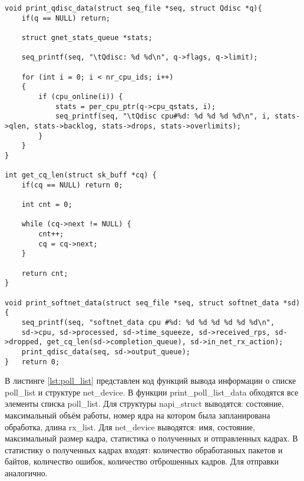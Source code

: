 \begin{center}
	\captionsetup{justification=raggedright,singlelinecheck=off}
	\begin{lstlisting}[label=lst:softnet_data_imp,caption=Функции вывода информации о структуре softnet\_data и Qdisc ,showstringspaces=false]
void print_qdisc_data(struct seq_file *seq, struct Qdisc *q){
	if(q == NULL) return;
	
	struct gnet_stats_queue *stats;
	
	seq_printf(seq, "\tQdisc: %d %d\n", q->flags, q->limit);
	
	for (int i = 0; i < nr_cpu_ids; i++)
	{
		if (cpu_online(i)) {
			stats = per_cpu_ptr(q->cpu_qstats, i);
			seq_printf(seq, "\tQdisc cpu#%d: %d %d %d %d\n", i, stats->qlen, stats->backlog, stats->drops, stats->overlimits);
		}
	}
}

int get_cq_len(struct sk_buff *cq) {
	if(cq == NULL) return 0;
	
	int cnt = 0;
	
	while (cq->next != NULL) {
		cnt++;
		cq = cq->next;
	}
	
	return cnt;
}

void print_softnet_data(struct seq_file *seq, struct softnet_data *sd){
	seq_printf(seq, "softnet_data cpu #%d: %d %d %d %d %d %d\n", 
	sd->cpu, sd->processed, sd->time_squeeze, sd->received_rps, sd->dropped, get_cq_len(sd->completion_queue), sd->in_net_rx_action);
	print_qdisc_data(seq, sd->output_queue);
}	return 0;
	\end{lstlisting}
\end{center}
\FloatBarrier

В листинге \ref{lst:poll_list} представлен код функций вывода информации о списке poll\_list и структуре net\_device. В функции print\_poll\_list\_data обходятся все элементы списка poll\_list. Для структуры napi\_struct выводятся: состояние, максимальный объём работы, номер ядра на котором была запланирована обработка, длина rx\_list. Для net\_device выводятся: имя, состояние, максимальный размер кадра, статистика о полученных и отправленных кадрах. В статистику о полученных кадрах входят: количество обработанных пакетов и байтов, количество ошибок, количество отброшенных кадров. Для отправки аналогично.

